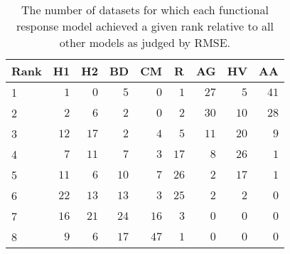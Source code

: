 \begin{table}[!tbp]
\caption{The number of datasets for which each functional response model achieved a given rank relative to all other models as judged by RMSE.\label{table:RMSE_rankings}} 
\begin{center}
\begin{tabular}{lrrrrrrrr}
\hline\hline
\multicolumn{1}{l}{Rank}&\multicolumn{1}{c}{H1}&\multicolumn{1}{c}{H2}&\multicolumn{1}{c}{BD}&\multicolumn{1}{c}{CM}&\multicolumn{1}{c}{R}&\multicolumn{1}{c}{AG}&\multicolumn{1}{c}{HV}&\multicolumn{1}{c}{AA}\tabularnewline
\hline
1&$ 1$&$ 0$&$ 5$&$ 0$&$ 1$&$27$&$ 5$&$41$\tabularnewline
2&$ 2$&$ 6$&$ 2$&$ 0$&$ 2$&$30$&$10$&$28$\tabularnewline
3&$12$&$17$&$ 2$&$ 4$&$ 5$&$11$&$20$&$ 9$\tabularnewline
4&$ 7$&$11$&$ 7$&$ 3$&$17$&$ 8$&$26$&$ 1$\tabularnewline
5&$11$&$ 6$&$10$&$ 7$&$26$&$ 2$&$17$&$ 1$\tabularnewline
6&$22$&$13$&$13$&$ 3$&$25$&$ 2$&$ 2$&$ 0$\tabularnewline
7&$16$&$21$&$24$&$16$&$ 3$&$ 0$&$ 0$&$ 0$\tabularnewline
8&$ 9$&$ 6$&$17$&$47$&$ 1$&$ 0$&$ 0$&$ 0$\tabularnewline
\hline
\end{tabular}\end{center}
\end{table}
